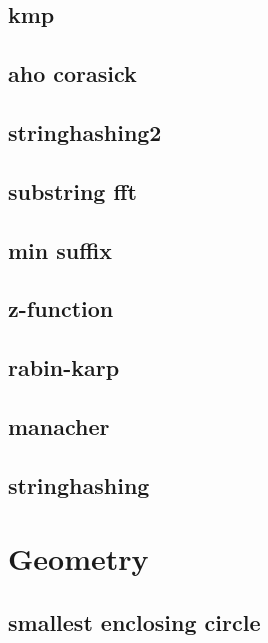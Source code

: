 \subsection{kmp}
\raggedbottom
\hrulefill
\subsection{aho corasick}
\raggedbottom
\hrulefill
\subsection{stringhashing2}
\raggedbottom
\hrulefill
\subsection{substring fft}
\raggedbottom
\hrulefill
\subsection{min suffix}
\raggedbottom
\hrulefill
\subsection{z-function}
\raggedbottom
\hrulefill
\subsection{rabin-karp}
\raggedbottom
\hrulefill
\subsection{manacher}
\raggedbottom
\hrulefill
\subsection{stringhashing}
\raggedbottom
\hrulefill

\section{Geometry}
\subsection{smallest enclosing circle}
\raggedbottom
\hrulefill
